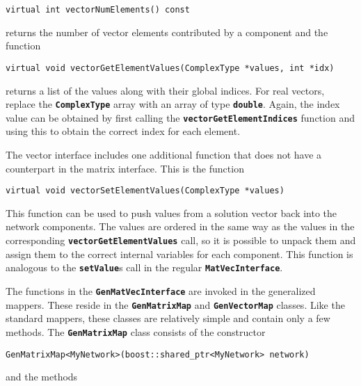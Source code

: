 {
\color{red}
\begin{Verbatim}[fontseries=b]
virtual int vectorNumElements() const
\end{Verbatim}
}

returns the number of vector elements contributed by a component and the function

{
\color{red}
\begin{Verbatim}[fontseries=b]
virtual void vectorGetElementValues(ComplexType *values, int *idx)
\end{Verbatim}
}

returns a list of the values along with their global indices. For real vectors, replace the \texttt{\textbf{ComplexType}} array with an array of type \texttt{\textbf{double}}. Again, the index value can be obtained by first calling the \texttt{\textbf{vectorGetElementIndices}} function and using this to obtain the correct index for each element.

The vector interface includes one additional function that does not have a counterpart in the matrix interface. This is the function

{
\color{red}
\begin{Verbatim}[fontseries=b]
virtual void vectorSetElementValues(ComplexType *values)
\end{Verbatim}
}

This function can be used to push values from a solution vector back into the network components. The values are ordered in the same way as the values in the corresponding \texttt{\textbf{vectorGetElementValues}} call, so it is possible to unpack them and assign them to the correct internal variables for each component. This function is analogous to the \texttt{\textbf{setValue}}s call in the regular \texttt{\textbf{MatVecInterface}}.

The functions in the \texttt{\textbf{GenMatVecInterface}} are invoked in the generalized mappers. These reside in the \texttt{\textbf{GenMatrixMap}} and \texttt{\textbf{GenVectorMap}} classes. Like the standard mappers, these classes are relatively simple and contain only a few methods. The \texttt{\textbf{GenMatrixMap}} class consists of the constructor

{
\color{red}
\begin{Verbatim}[fontseries=b]
GenMatrixMap<MyNetwork>(boost::shared_ptr<MyNetwork> network)
\end{Verbatim}
}

and the methods

